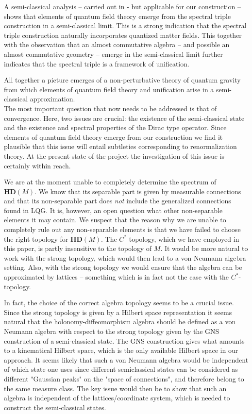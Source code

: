 \documentclass[12pt]{article}
\begin{document}
A semi-classical analysis -- carried out in \cite{AGNP1}-\cite{AGN3} but applicable for our construction -- shows that elements of quantum field theory emerge from the spectral triple construction in a semi-classical limit. This is a strong indication that the spectral triple construction naturally incorporates quantized matter fields. This together with
the observation that an almost commutative algebra -- and possible an almost commutative geometry -- emerge in the semi-classical limit further indicates that the spectral triple is a framework of unification.


All together a picture emerges of a non-perturbative theory of quantum gravity from which elements of quantum field theory and unification arise in a semi-classical approximation.\\








The most important question that now needs to be addressed is that of convergence. Here, two issues are crucial: the existence of the semi-classical state and the existence and spectral properties of the Dirac type operator. Since elements of quantum field theory emerge from our construction we find it plausible that this issue will entail subtleties corresponding to renormalization theory. At the present state of the project the investigation of this issue is certainly within reach.

We are at the moment unable to completely determine the spectrum of $\mathbf{HD}(M) $. We know that its separable part is given by measurable connections and that its non-separable part does {\it not} include the generalized connections found in LQG. It is, however, an open question what other non-separable elements it may contain. We suspect that the reason why we are unable to completely rule out any non-separable elements is that we have failed to choose the right topology for $\mathbf{HD}(M) $. The $C^*$-topology, which we have employed in this paper, is partly insensitive to the topology of $M$. It would be more natural to work with the strong topology, which would then lead to a von Neumann algebra setting. Also, with the strong topology we would ensure that the algebra can be approximated by lattices -- something which is in fact not the case with the $C^*$-topology.

In fact, the choice of the correct algebra topology seems to be a crucial issue. Since the strong topology is given by a Hilbert space representation it seems natural that the holonomy-diffeomorphism algebra should be defined as a von Neumann algebra with respect to the strong topology given by the GNS construction of a semi-classical state. The GNS construction gives what amounts to a kinematical Hilbert space, which is the only available Hilbert space in our approach. It seems likely that such a von Neumann algebra would be independent of which state one uses since different semiclassical states can be considered as different "Gaussian peaks" on the "space of connections", and therefore belong to the same measure class. The key issue would then be to show that such an algebra is independent of the lattices/coordinate system, which is needed to construct the semi-classical states. 
\end{document}
